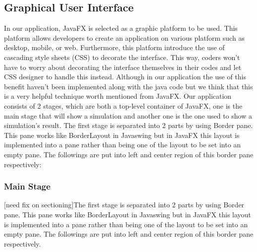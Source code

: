 \documentclass[11pt]{article}
\begin{document}
\subsection{Graphical User Interface}
In our application, JavaFX is selected as a graphic platform to be used. This platform allows developers to create an application on various platform such as desktop, mobile, or web. Furthermore, this platform introduce the use of cascading style sheets (CSS) to decorate the interface. This way, coders won’t have to worry about decorating the interface themselves in their codes and let CSS designer to handle this instead. Although in our application the use of this benefit haven’t been implemented along with the java code but we think that this is a very helpful technique worth mentioned from JavaFX.
Our application consists of 2 stages, which are both a top-level container of JavaFX, one is the main stage that will show a simulation and another one is the one used to show a simulation’s result. The first stage is separated into 2 parts by using Border pane. This pane works like BorderLayout in Javaswing but in JavaFX this layout is implemented into a pane rather than being one of the layout to be set into an empty pane. The followings are put into left and center region of this border pane respectively:
\subsubsection{Main Stage}
	[need fix on sectioning]The first stage is separated into 2 parts by using Border pane. This pane works like BorderLayout in Javaswing but in JavaFX this layout is implemented into a pane rather than being one of the layout to be set into an empty pane. The followings are put into left and center region of this border pane respectively.
\end{document}
